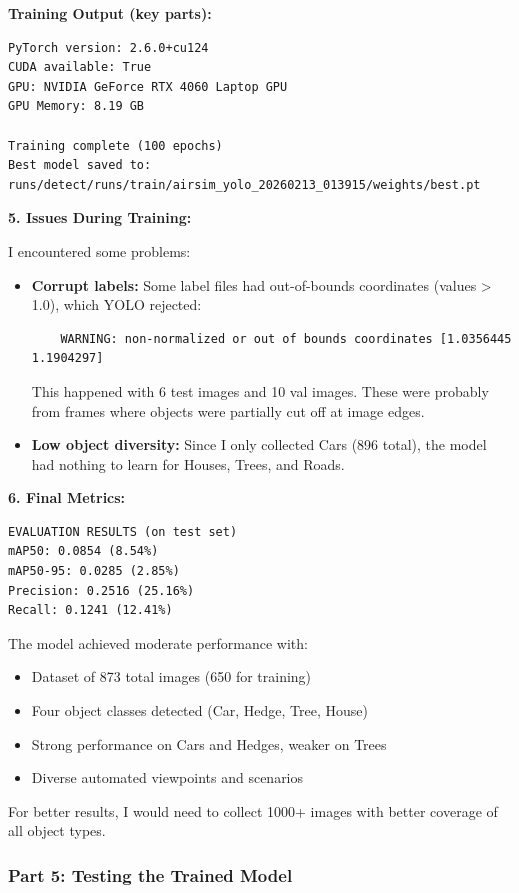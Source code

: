 \textbf{Training Output (key parts):}
\begin{verbatim}
PyTorch version: 2.6.0+cu124
CUDA available: True
GPU: NVIDIA GeForce RTX 4060 Laptop GPU
GPU Memory: 8.19 GB

Training complete (100 epochs)
Best model saved to: runs/detect/runs/train/airsim_yolo_20260213_013915/weights/best.pt
\end{verbatim}

\textbf{5. Issues During Training:}

I encountered some problems:
\begin{itemize}
	\item \textbf{Corrupt labels:} Some label files had out-of-bounds coordinates (values > 1.0), which YOLO rejected:
	\begin{verbatim}
	WARNING: non-normalized or out of bounds coordinates [1.0356445 1.1904297]
	\end{verbatim}
	This happened with 6 test images and 10 val images. These were probably from frames where objects were partially cut off at image edges.
	
	\item \textbf{Low object diversity:} Since I only collected Cars (896 total), the model had nothing to learn for Houses, Trees, and Roads.
\end{itemize}

\textbf{6. Final Metrics:}

\begin{verbatim}
EVALUATION RESULTS (on test set)
mAP50: 0.0854 (8.54%)
mAP50-95: 0.0285 (2.85%)
Precision: 0.2516 (25.16%)
Recall: 0.1241 (12.41%)
\end{verbatim}

The model achieved moderate performance with:
\begin{itemize}
	\item Dataset of 873 total images (650 for training)
	\item Four object classes detected (Car, Hedge, Tree, House)
	\item Strong performance on Cars and Hedges, weaker on Trees
	\item Diverse automated viewpoints and scenarios
\end{itemize}

For better results, I would need to collect 1000+ images with better coverage of all object types.

\clearpage

\subsubsection{Part 5: Testing the Trained Model}

